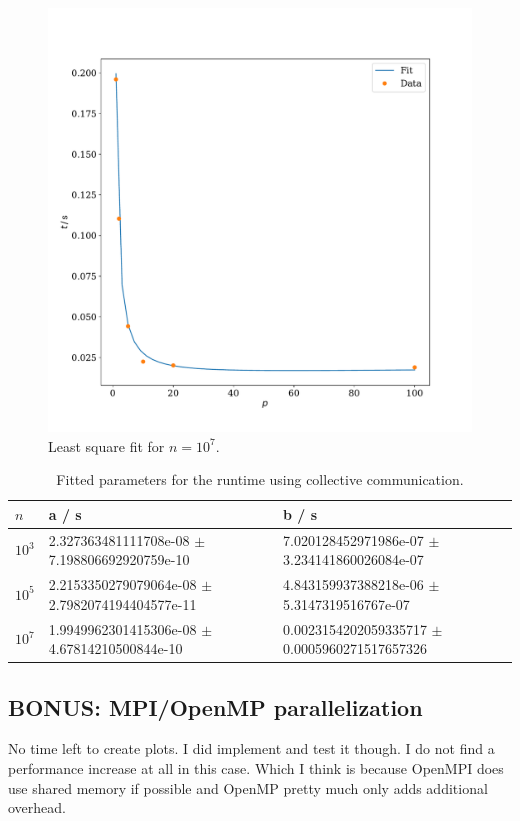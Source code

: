 \documentclass[a4paper, 11pt]{article}
\begin{document}
\begin{figure}
  \centering
  \includegraphics[width=\textwidth]{../trapezoid/plot/fit_10000000.pdf}
  \caption{Least square fit for $n=10^{7}$.}
  \label{fig:fit_10M}
\end{figure}
\begin{table}[ht]
\small
\begin{tabular}{lll}
$n$      & a / s                                          & b / s                 \\
\hline
$10^{3}$ & 2.327363481111708e-08 $\pm$ 7.198806692920759e-10 & 7.020128452971986e-07 $\pm$ 3.234141860026084e-07 \\
$10^{5}$ & 2.2153350279079064e-08 $\pm$ 2.7982074194404577e-11 & 4.843159937388218e-06 $\pm$ 5.3147319516767e-07 \\
$10^{7}$ & 1.9949962301415306e-08 $\pm$ 4.67814210500844e-10 & 0.0023154202059335717 $\pm$ 0.0005960271517657326 \\
\end{tabular}
\caption{Fitted parameters for the runtime using collective communication.}
\label{tab:fit_paras}
\end{table}

\FloatBarrier
\subsection*{BONUS: MPI/OpenMP parallelization}
No time left to create plots. I did implement and test it though. I do not find
a performance increase at all in this case. Which I think is because OpenMPI
does use shared memory if possible and OpenMP pretty much only adds additional
overhead. 
\end{document}

